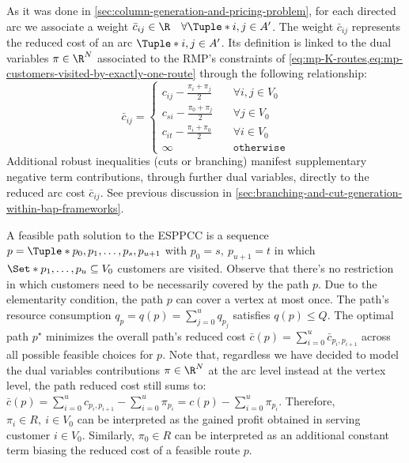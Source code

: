 As it was done in \cref{sec:column-generation-and-pricing-problem},
for each directed arc we associate a weight
$\bar{c}_{ij} \in \R \quad \forall \Tuple*{i, j} \in A^\prime$.
The weight $\bar{c}_{ij}$ represents the reduced cost of an arc $\Tuple*{i, j} \in A^\prime$.
Its definition is linked to the dual variables $\pi \in \R^N$ associated to
the RMP's constraints of \cref{eq:mp-K-routes,eq:mp-customers-visited-by-exactly-one-route}
through the following relationship:
\begin{equation}
	\bar{c}_{ij} = \begin{cases}
		c_{ij} - \frac{\pi_i + \pi_j}{2} & \quad \forall i, j \in V_0 \\
		c_{si} - \frac{\pi_0 + \pi_j}{2} & \quad \forall j \in V_0    \\
		c_{it} - \frac{\pi_i + \pi_0}{2} & \quad \forall i \in V_0    \\
		\infty                           & \quad \texttt{otherwise}
	\end{cases}
\end{equation}
Additional robust inequalities (cuts or branching) manifest
supplementary negative term contributions, through further dual variables,
directly to the reduced arc cost $\bar{c}_{ij}$.
See previous discussion in \cref{sec:branching-and-cut-generation-within-bap-frameworks}.

A feasible path solution to the ESPPCC is a sequence $p = \Tuple*{p_0, p_1, \dots, p_s, p_{u+1}}$
with $p_0 = s, \ p_{u + 1} = t$
in which $\Set*{p_1, \dots, p_u} \subseteq V_0$ customers are visited.
Observe that there's no restriction in which customers need to be necessarily covered
by the path $p$.
Due to the elementarity condition, the path $p$ can cover a vertex at most once.
The path's resource consumption $q_p = q(p) = \sum_{j=0}^{u} q_{p_j}$
satisfies $q(p) \le Q$.
The optimal path $p^\star$ minimizes the overall path's reduced cost
$\bar{c}(p) = \sum_{i=0}^{u} \bar{c}_{p_i,p_{i+1}}$ across all
possible feasible choices for $p$.
Note that, regardless we have decided to model
the dual variables contributions $\pi \in \R^N$
at the arc level instead at the vertex level,
the path reduced cost still sums to:
$\bar{c}(p) = \sum_{i=0}^{u} c_{p_i,p_{i+1}} - \sum_{i=0}^{u} \pi_{p_i} = c(p) - \sum_{i=0}^{u} \pi_{p_i}$.
Therefore, $\pi_i \in R,\ i \in V_0$ can be interpreted as the
gained profit obtained in serving customer $i \in V_0$.
Similarly,
$\pi_0 \in R$ can be interpreted as an additional constant term
biasing the reduced cost of a feasible route $p$.

